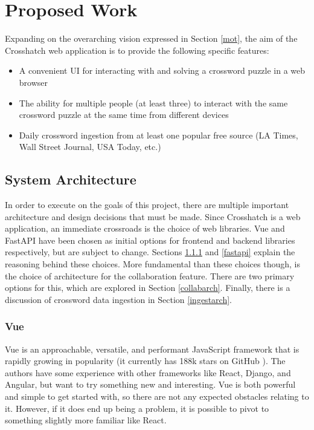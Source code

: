 \documentclass{article}
\begin{document}
\section{Proposed Work}
Expanding on the overarching vision expressed in Section \ref{mot}, the aim of the Crosshatch web application is to provide the following
specific features:
\begin{itemize}
  \item A convenient UI for interacting with and solving a crossword puzzle in a web browser
  \item The ability for multiple people (at least three) to interact with the same crossword puzzle at the same time from different devices
  \item Daily crossword ingestion from at least one popular free source (LA Times, Wall Street Journal, USA Today, etc.)
\end{itemize}

\subsection{System Architecture}

In order to execute on the goals of this project, there are multiple important architecture and design decisions that must be made.
Since Crosshatch
is a web application, an immediate crossroads is the choice of web libraries. Vue and FastAPI have been chosen
as initial options for frontend and backend libraries respectively, but are subject to change. Sections \ref{vue}
and \ref{fastapi} explain the reasoning behind these choices.
More fundamental than these choices though, is the choice of architecture for the collaboration feature. There are two primary
options for this, which are explored in Section \ref{collabarch}. Finally, there is a discussion of crossword data ingestion in
Section \ref{ingestarch}.

\subsubsection{Vue}
\label{vue}
Vue \cite{vue} is an approachable, versatile, and performant JavaScript framework that is rapidly growing
in popularity (it currently has 188k stars on GitHub \cite{vuegithub}). The authors have some experience
with other frameworks like React, Django, and Angular, but want to try something new and interesting.
Vue is both powerful and simple to get started with, so there are not any expected obstacles
relating to it. However, if it does end up being a problem, it is possible to pivot to something
slightly more familiar like React.
\end{document}
